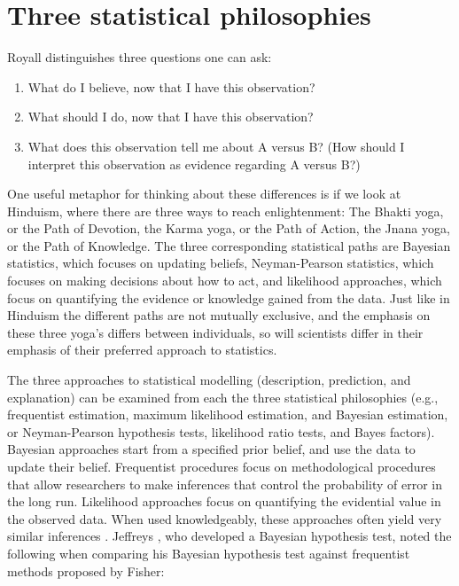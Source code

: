 \documentclass[
  oneside]{krantz}
\providecommand{\tightlist}{%
  \setlength{\itemsep}{0pt}\setlength{\parskip}{0pt}}
\begin{document}
\hypertarget{three-statistical-philosophies}{%
\section{Three statistical philosophies}\label{three-statistical-philosophies}}

Royall \citeyearpar{royall_statistical_1997} distinguishes three questions one can ask:

\begin{enumerate}
\def\labelenumi{\arabic{enumi}.}
\tightlist
\item
  What do I believe, now that I have this observation?
\item
  What should I do, now that I have this observation?
\item
  What does this observation tell me about A versus B? (How should I interpret this observation as evidence regarding A versus B?)
\end{enumerate}

One useful metaphor for thinking about these differences is if we look at Hinduism, where there are three ways to reach enlightenment: The Bhakti yoga, or the Path of Devotion, the Karma yoga, or the Path of Action, the Jnana yoga, or the Path of Knowledge. The three corresponding statistical paths are Bayesian statistics, which focuses on updating beliefs, Neyman-Pearson statistics, which focuses on making decisions about how to act, and likelihood approaches, which focus on quantifying the evidence or knowledge gained from the data. Just like in Hinduism the different paths are not mutually exclusive, and the emphasis on these three yoga's differs between individuals, so will scientists differ in their emphasis of their preferred approach to statistics.

The three approaches to statistical modelling (description, prediction, and explanation) can be examined from each the three statistical philosophies (e.g., frequentist estimation, maximum likelihood estimation, and Bayesian estimation, or Neyman-Pearson hypothesis tests, likelihood ratio tests, and Bayes factors). Bayesian approaches start from a specified prior belief, and use the data to update their belief. Frequentist procedures focus on methodological procedures that allow researchers to make inferences that control the probability of error in the long run. Likelihood approaches focus on quantifying the evidential value in the observed data. When used knowledgeably, these approaches often yield very similar inferences \citep{dongen_multiple_2019, lakens_improving_2020, tendeiro_review_2019}. Jeffreys \citeyearpar{jeffreys_theory_1939}, who developed a Bayesian hypothesis test, noted the following when comparing his Bayesian hypothesis test against frequentist methods proposed by Fisher:
\end{document}
